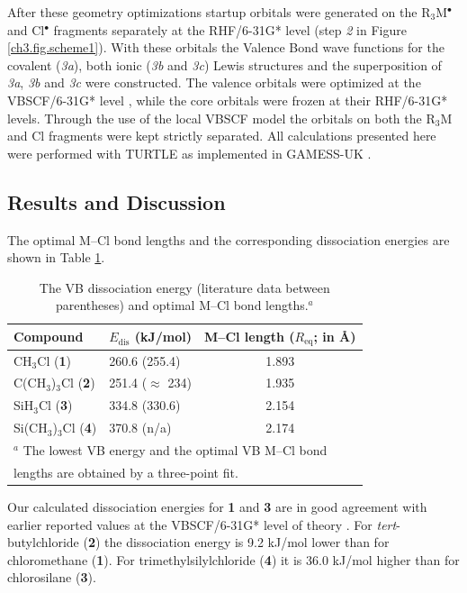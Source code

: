 After these geometry optimizations startup orbitals were generated on the R$_3$M$^{\bullet}$ and Cl$^{\bullet}$ fragments separately at the \mbox{RHF/6-31G*} level (step \textit{2} in Figure \ref{ch3.fig.scheme1}).  With these orbitals the Valence Bond wave functions for the covalent (\textit{3a}), both ionic (\textit{3b} and \textit{3c}) Lewis structures and the superposition of \textit{3a}, \textit{3b} and \textit{3c} were constructed. The valence orbitals were optimized at the \mbox{VBSCF/6-31G*} level \cite{vbscf1,vbscf2}, while the core orbitals were frozen at their \mbox{RHF/6-31G*} levels.
Through the use of the local VBSCF model the orbitals on both the R$_3$M and Cl fragments were kept strictly separated. All calculations presented here were performed with TURTLE \cite{turtle} as implemented in GAMESS-UK \cite{gamess}.

\subsection{Results and Discussion}

The optimal M--Cl bond lengths and the corresponding dissociation energies are shown in Table \ref{ch3.tab.optimal}.  
\begin{table}[htp]
\center
\caption{The VB dissociation energy (literature data \cite{lauvergnat,song} between parentheses) and optimal M--Cl bond lengths.$^a$}
\begin{tabular}{|l|l|c|} 
\hline
Compound &$E_\mathrm{dis}$ (kJ/mol)& M--Cl length ($R_\mathrm{eq}$; in \AA)\\
\hline
CH$_3$Cl (\textbf{1})& 260.6 (255.4) & 1.893 \\
C(CH$_3$)$_3$Cl (\textbf{2}) & 251.4 ($\approx$ 234) & 1.935 \\
SiH$_3$Cl (\textbf{3})& 334.8 (330.6)& 2.154 \\
Si(CH$_3$)$_3$Cl (\textbf{4}) & 370.8 (n/a) & 2.174 \\
\hline
\multicolumn{3}{l}{\small{$^a$ The lowest VB energy and the optimal VB M--Cl bond}}\\
\multicolumn{3}{l}{\small{lengths are obtained by a three-point fit.}}\\
\end{tabular}
\label{ch3.tab.optimal}
\end{table}
Our calculated dissociation energies for \textbf{1} and \textbf{3} are in good agreement with earlier reported values at the VBSCF/6-31G* level of theory \cite{lauvergnat}.  For \textit{tert}-butylchloride (\textbf{2}) the dissociation energy is 9.2 kJ/mol lower than for chloromethane (\textbf{1}). For trimethylsilylchloride (\textbf{4}) it is 36.0 kJ/mol higher than for chlorosilane (\textbf{3}). 
 
